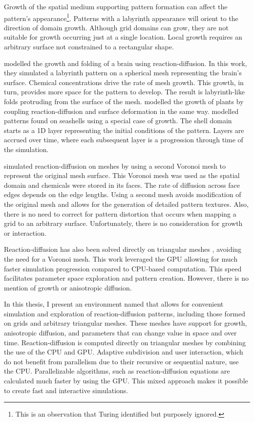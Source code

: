 Growth of the spatial medium supporting pattern formation can affect the pattern's appearance\footnote{This is an observation that Turing identified but purposely ignored.}. Patterns with a labyrinth appearance will orient to the direction of domain growth. Although grid domains can grow, they are not suitable for growth occurring just at a single location. Local growth requires an arbitrary surface not constrained to a rectangular shape.

\citet{lefevre2010} modelled the growth and folding of a brain using reaction-diffusion. In this work, they simulated a labyrinth pattern on a spherical mesh representing the brain's surface. Chemical concentrations drive the rate of mesh growth. This growth, in turn, provides more space for the pattern to develop. The result is labyrinth-like folds protruding from the surface of the mesh. \citet{harrison2002, holloway2007} modelled the growth of plants by coupling reaction-diffusion and surface deformation in the same way. \citet{fowler1992} modelled patterns found on seashells using a special case of growth. The shell domain starts as a 1D layer representing the initial conditions of the pattern. Layers are accrued over time, where each subsequent layer is a progression through time of the simulation.

\citet{turk1991} simulated reaction-diffusion on meshes by using a second Voronoi mesh to represent the original mesh surface. This Voronoi mesh was used as the spatial domain and chemicals were stored in its faces. The rate of diffusion across face edges depends on the edge lengths. Using a second mesh avoids modification of the original mesh and allows for the generation of detailed pattern textures. Also, there is no need to correct for pattern distortion that occurs when mapping a grid to an arbitrary surface. Unfortunately, there is no consideration for growth or interaction. %

Reaction-diffusion has also been solved directly on triangular meshes \citep{descombes2016}, avoiding the need for a Voronoi mesh. This work leveraged the GPU allowing for much faster simulation progression compared to CPU-based computation. This speed facilitates parameter space exploration and pattern creation. However, there is no mention of growth or anisotropic diffusion.

In this thesis, I present an environment named \ProgramName{} that allows for convenient simulation and exploration of reaction-diffusion patterns, including those formed on grids and arbitrary triangular meshes. These meshes have support for growth, anisotropic diffusion, and parameters that can change value in space and over time. Reaction-diffusion is computed directly on triangular meshes by combining the use of the CPU and GPU. Adaptive subdivision and user interaction, which do not benefit from parallelism due to their recursive or sequential nature,  use the CPU. Parallelizable algorithms, such as reaction-diffusion equations are calculated much faster by using the GPU. This mixed approach makes it possible to create fast and interactive simulations. 

